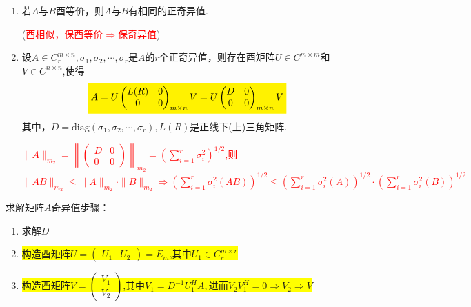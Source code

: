 \begin{theorem}
\begin{enumerate}
\item 若$A$与$B$酉等价，则$A$与$B$有相同的正奇异值.

(\textcolor{red}{酉相似，保酉等价$\Rightarrow$保奇异值})
\item 设$A\in C^{m \times n}_r, \sigma_1,\sigma_2,\cdots,\sigma_r $是$A$的$r$个正奇异值，则存在酉矩阵$U\in C^{m\times m}$和$V\in C^{n\times n}$,使得
\[\colorbox{yellow}{$
A=U\begin{pmatrix}
	L(R)&0\\
	0&0
\end{pmatrix}_{m\times n}V=U\begin{pmatrix}
	D&0\\
	0&0
\end{pmatrix}_{m\times n}V
$}\]
其中，$D=\mathrm{diag}(\sigma_1,\sigma_2,\cdots,\sigma_r),L(R)$是正线下(上)三角矩阵.
\begin{note}
	\textcolor{red}{$\|A\|_{m_2}=\left\|\begin{pmatrix} D&0\\0&0 \end{pmatrix}  \right\|_{m_2}=\left(\sum\limits_{i=1}^r\sigma_i^2\right)^{1/2}$,则\\
		$\|AB\|_{m_2}\leq\|A\|_{m_2}\cdot\|B\|_{m_2}\Rightarrow
	 \left(\sum\limits_{i=1}^r\sigma_i^2(AB)\right)^{1/2}\leq
		 \left(\sum\limits_{i=1}^r\sigma_i^2(A)\right)^{1/2}\cdot  \left(\sum\limits_{i=1}^r\sigma_i^2(B)\right)^{1/2}
		 $	
		}
\end{note}
\end{enumerate}	
\end{theorem}

\noindent 求解矩阵$A$奇异值步骤：
\begin{enumerate}
	\item 求解$D$
	\item \colorbox{yellow}{构造酉矩阵$U=\begin{pmatrix}U_1&U_2\end{pmatrix}=E_m$,其中$U_1\in C^{m\times r}_r$}
	\item\colorbox{yellow}{构造酉矩阵$V=\begin{pmatrix}V_1\\V_2\end{pmatrix}$,其中$V_1=D^{-1}U_1^HA,$进而$V_2V_1^H=0\Rightarrow V_2\Rightarrow V$}
\end{enumerate}	




